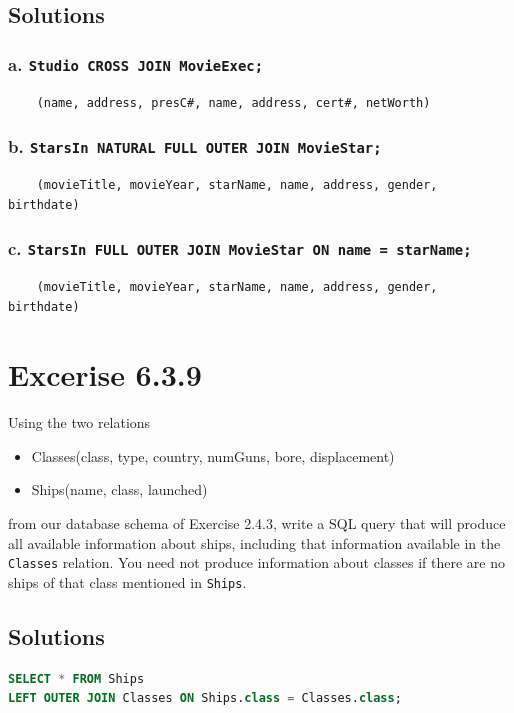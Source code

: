 \documentclass{cshwk}
\begin{document}
\subsection{Solutions}

\subsubsection*{a. \texttt{Studio CROSS JOIN MovieExec;}}

\begin{verbatim}
    (name, address, presC#, name, address, cert#, netWorth)
\end{verbatim}

\subsubsection*{b. \texttt{StarsIn NATURAL FULL OUTER JOIN MovieStar;}}

\begin{verbatim}
    (movieTitle, movieYear, starName, name, address, gender, birthdate)
\end{verbatim}

\subsubsection*{c. \texttt{StarsIn FULL OUTER JOIN MovieStar ON name = starName;}}
\begin{verbatim}
    (movieTitle, movieYear, starName, name, address, gender, birthdate)
\end{verbatim}


\section{Excerise 6.3.9}
Using the two relations

\begin{itemize}
    \item Classes(class, type, country, numGuns, bore, displacement)
    \item Ships(name, class, launched)
\end{itemize}

from our database schema of Exercise 2.4.3, write a SQL query that will produce all available information about ships, including that information available in the \texttt{Classes} relation. You need not produce information about classes if there are no ships of that class mentioned in \texttt{Ships}.

\subsection{Solutions}

\begin{lstlisting}[language=sql]
SELECT * FROM Ships
LEFT OUTER JOIN Classes ON Ships.class = Classes.class;
\end{lstlisting}
\end{document}
